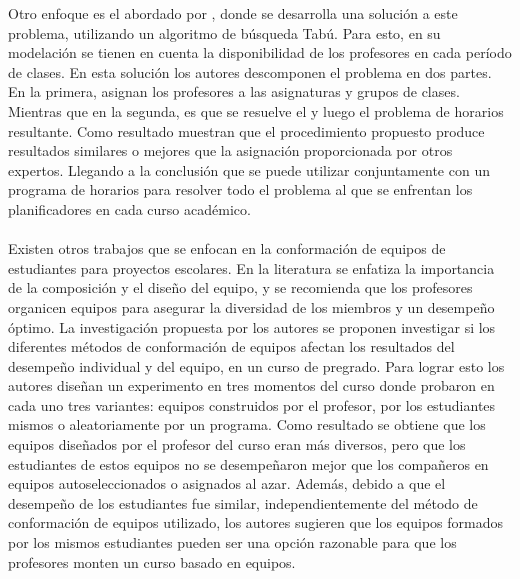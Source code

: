 Otro enfoque es el abordado por \cite{AlvaresValedes2002}, donde se desarrolla una solución a este problema, utilizando un algoritmo de búsqueda Tabú. Para esto, en su modelación se tienen en cuenta la disponibilidad de los profesores en cada período de clases. En esta solución los autores descomponen el problema en dos partes. En la primera, asignan los profesores a las asignaturas y grupos de clases. Mientras que en la segunda, es que se resuelve el y luego el problema de horarios resultante. Como resultado muestran que el procedimiento propuesto produce resultados similares o mejores que la asignación proporcionada por otros expertos. Llegando a la conclusión que se puede utilizar conjuntamente con un programa de horarios para resolver todo el problema al que se enfrentan los planificadores en cada curso académico.\\\\


Existen otros trabajos que se enfocan en la conformación de equipos de estudiantes para proyectos escolares. En la literatura se enfatiza la importancia de la composición y el diseño del equipo, y se recomienda que los profesores organicen equipos para asegurar la diversidad de los miembros y un desempeño óptimo. La investigación propuesta por \cite{Pociask2017} los autores se proponen investigar si los diferentes métodos de conformación de equipos afectan los resultados del desempeño individual y del equipo, en un curso de pregrado. Para lograr esto los autores diseñan un experimento en tres momentos del curso donde probaron en cada uno tres variantes: equipos construidos por el profesor, por los estudiantes mismos o aleatoriamente por un programa. Como resultado se obtiene que los equipos diseñados por el profesor del curso eran más diversos, pero que los estudiantes de estos equipos no se desempeñaron mejor que los compañeros en equipos autoseleccionados o asignados al azar. Además, debido a que el desempeño de los estudiantes fue similar, independientemente del método de conformación de equipos utilizado, los autores sugieren que los equipos formados por los mismos estudiantes pueden ser una opción razonable para que los profesores monten un curso basado en equipos. \\\\


